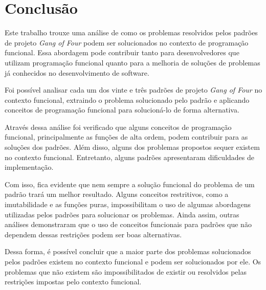 \chapter{Conclusão}


Este trabalho trouxe uma análise de como os 
problemas resolvidos pelos padrões de projeto 
\textit{Gang of Four} podem ser solucionados no 
contexto de programação funcional. Essa abordagem 
pode contribuir tanto para desenvolvedores que 
utilizam programação funcional quanto para a 
melhoria de soluções de problemas já conhecidos 
no desenvolvimento de software.


Foi possível analisar cada um dos vinte e 
três padrões de projeto \textit{Gang of Four} 
no contexto funcional, extraindo o problema 
solucionado pelo padrão e aplicando conceitos 
de programação funcional para solucioná-lo de 
forma alternativa.


Através dessa análise foi verificado que 
alguns conceitos de programação funcional, 
principalmente as funções de alta 
ordem, podem contribuir para as soluções dos 
padrões. Além disso, alguns dos problemas 
propostos sequer existem no contexto funcional. 
Entretanto, alguns padrões apresentaram 
dificuldades de implementação.


Com isso, fica evidente que nem sempre 
a solução funcional do problema de um 
padrão trará um melhor resultado. Alguns 
conceitos restritivos, como a imutabilidade 
e as funções puras, impossibilitam 
o uso de algumas abordagens utilizadas 
pelos padrões para solucionar os problemas. 
Ainda assim, outras análises demonstraram 
que o uso de conceitos funcionais para 
padrões que não dependem dessas restrições 
podem ser boas alternativas. 



Dessa forma, é possível concluir que a maior 
parte dos problemas solucionados pelos 
padrões existem no contexto funcional e 
podem ser solucionados por ele. Os problemas 
que não existem são impossibilitados de 
existir ou resolvidos pelas restrições 
impostas pelo contexto funcional. 

